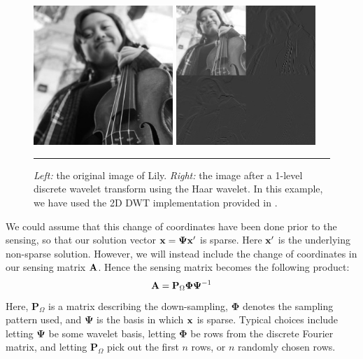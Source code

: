 \begin{figure}[t]
	\centering
	\includegraphics[width=0.47\textwidth]{figs/lily.jpg}
	\hspace{.039\textwidth}
	\includegraphics[width=0.47\textwidth]{figs/lily_wavelet.jpg}
	\caption{\textit{Left:} the original image of Lily. \textit{Right:} the image after a 1-level discrete wavelet transform using the Haar wavelet. In this example, we have used the 2D DWT implementation provided in \cite{ryan16applinalg}.}
	\label{fig:dwt_sparsifying}
	\vspace{4pt}\hrule
\end{figure}

We could assume that this change of coordinates have been done prior to the sensing, so that our solution vector $ \mathbf{x} = \mathbf{\Psi}\mathbf{x}' $ is sparse. Here $ \mathbf{x}' $ is the underlying non-sparse solution. However, we will instead include the change of coordinates in our sensing matrix $ \mathbf{A} $. Hence the sensing matrix becomes the following product:
\begin{equation}
	\label{eq:sensingmatrix_composition}
	\mathbf{A} = \mathbf{P}_{\Omega}\mathbf{\Phi}\mathbf{\Psi}^{-1}
\end{equation}
Here, $ \mathbf{P}_{\Omega} $ is a matrix describing the down-sampling, $ \mathbf{\Phi} $ denotes the sampling pattern used, and $ \mathbf{\Psi} $ is the basis in which $ \mathbf{x} $ is sparse. Typical choices include letting $ \mathbf{\Psi} $ be some wavelet basis, letting $ \mathbf{\Phi} $ be rows from the discrete Fourier matrix, and letting $ \mathbf{P}_{\Omega} $ pick out the first $ n $ rows, or $ n $ randomly chosen rows. 

